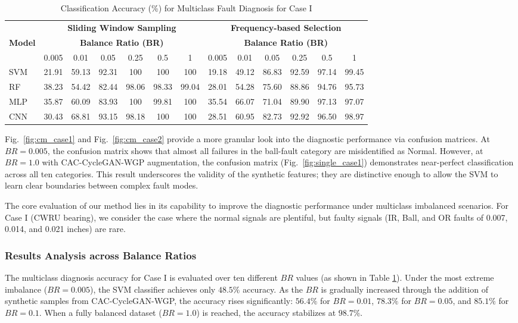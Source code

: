 \begin{table}[!t]
\centering
\caption{Classification Accuracy (\%) for Multiclass Fault Diagnosis for Case I}
\label{tab:acc_case1}
\begin{tabular}{lcccccccccccc}
\hline
 & \multicolumn{6}{c}{\textbf{Sliding Window Sampling}} & \multicolumn{6}{c}{\textbf{Frequency-based Selection}} \\
\textbf{Model} & \multicolumn{6}{c}{\textbf{Balance Ratio (BR)}} & \multicolumn{6}{c}{\textbf{Balance Ratio (BR)}} \\
 & 0.005 & 0.01 & 0.05 & 0.25 & 0.5 & 1 & 0.005 & 0.01 & 0.05 & 0.25 & 0.5 & 1 \\ \hline
SVM & 21.91 & 59.13 & 92.31 & 100 & 100 & 100 & 19.18 & 49.12 & 86.83 & 92.59 & 97.14 & 99.45 \\
RF & 38.23 & 54.42 & 82.44 & 98.06 & 98.33 & 99.04 & 28.01 & 54.28 & 75.60 & 88.86 & 94.76 & 95.73 \\
MLP & 35.87 & 60.09 & 83.93 & 100 & 99.81 & 100 & 35.54 & 66.07 & 71.04 & 89.90 & 97.13 & 97.07 \\
CNN & 30.43 & 68.81 & 93.15 & 98.18 & 100 & 100 & 28.51 & 60.95 & 82.73 & 92.92 & 96.50 & 98.97 \\
\hline
\end{tabular}
\end{table}

Fig.~\ref{fig:cm_case1} and Fig.~\ref{fig:cm_case2} provide a more granular look into the diagnostic performance via confusion matrices. At $BR=0.005$, the confusion matrix shows that almost all failures in the ball-fault category are misidentified as Normal. However, at $BR=1.0$ with CAC-CycleGAN-WGP augmentation, the confusion matrix (Fig.~\ref{fig:single_case1}) demonstrates near-perfect classification across all ten categories. This result underscores the validity of the synthetic features; they are distinctive enough to allow the SVM to learn clear boundaries between complex fault modes.

The core evaluation of our method lies in its capability to improve the diagnostic performance under multiclass imbalanced scenarios. For Case I (CWRU bearing), we consider the case where the normal signals are plentiful, but faulty signals (IR, Ball, and OR faults of 0.007, 0.014, and 0.021 inches) are rare.

\subsubsection{Results Analysis across Balance Ratios}
The multiclass diagnosis accuracy for Case I is evaluated over ten different $BR$ values (as shown in Table \ref{tab:acc_case1}). Under the most extreme imbalance ($BR = 0.005$), the SVM classifier achieves only $48.5\%$ accuracy. As the $BR$ is gradually increased through the addition of synthetic samples from CAC-CycleGAN-WGP, the accuracy rises significantly: $56.4\%$ for $BR=0.01$, $78.3\%$ for $BR=0.05$, and $85.1\%$ for $BR=0.1$. When a fully balanced dataset ($BR=1.0$) is reached, the accuracy stabilizes at $98.7\%$.

